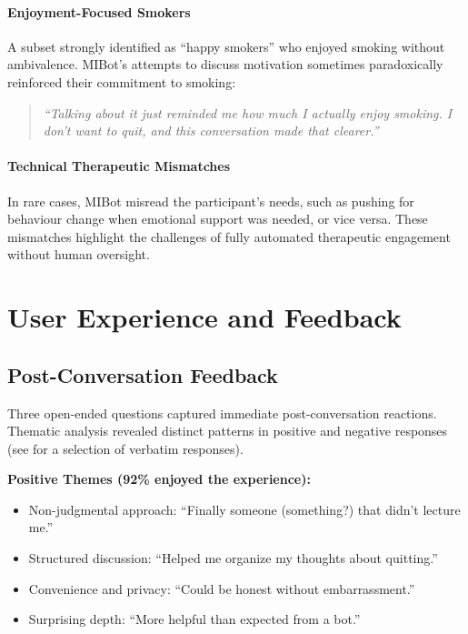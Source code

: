 \paragraph{Enjoyment-Focused Smokers}
A subset strongly identified as ``happy smokers'' who enjoyed smoking without ambivalence. MIBot's attempts to discuss motivation sometimes paradoxically reinforced their commitment to smoking:

\begin{quote}
	\textit{``Talking about it just reminded me how much I actually enjoy smoking. I don't want to quit, and this conversation made that clearer.''}
\end{quote}

\paragraph{Technical Therapeutic Mismatches}
In rare cases, MIBot misread the participant's needs, such as pushing for behaviour change when emotional support was needed, or vice versa. These mismatches highlight the challenges of fully automated therapeutic engagement without human oversight.

\section{User Experience and Feedback}
\label{sec:feedback}

\subsection*{Post-Conversation Feedback}

Three open-ended questions captured immediate post-conversation reactions. Thematic analysis revealed distinct patterns in positive and negative responses (see  for a selection of verbatim responses).

\textbf{Positive Themes (92\% enjoyed the experience):}
\begin{itemize}
	\item Non-judgmental approach: ``Finally someone (something?) that didn't lecture me.''
	\item Structured discussion: ``Helped me organize my thoughts about quitting.''
	\item Convenience and privacy: ``Could be honest without embarrassment.''
	\item Surprising depth: ``More helpful than expected from a bot.''
\end{itemize}

